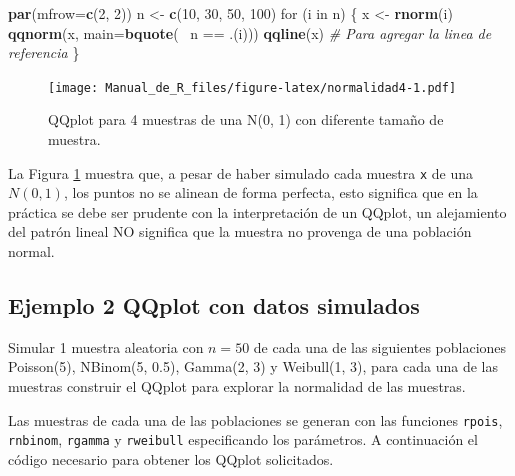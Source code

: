 \documentclass[10pt,]{krantz}
\makeatletter
\newenvironment{Shaded}{\begin{snugshade}}{\end{snugshade}}
\newcommand{\KeywordTok}[1]{\textcolor[rgb]{0.13,0.29,0.53}{\textbf{{#1}}}}
\newcommand{\DataTypeTok}[1]{\textcolor[rgb]{0.13,0.29,0.53}{{#1}}}
\newcommand{\DecValTok}[1]{\textcolor[rgb]{0.00,0.00,0.81}{{#1}}}
\newcommand{\StringTok}[1]{\textcolor[rgb]{0.31,0.60,0.02}{{#1}}}
\newcommand{\CommentTok}[1]{\textcolor[rgb]{0.56,0.35,0.01}{\textit{{#1}}}}
\newcommand{\NormalTok}[1]{{#1}}
\newenvironment{kframe}{%
\medskip{}
\setlength{\fboxsep}{.8em}
 \def\at@end@of@kframe{}%
 \ifinner\ifhmode%
  \def\at@end@of@kframe{\end{minipage}}%
  \begin{minipage}{\columnwidth}%
 \fi\fi%
 \def\FrameCommand##1{\hskip\@totalleftmargin \hskip-\fboxsep
 \colorbox{shadecolor}{##1}\hskip-\fboxsep
     \hskip-\linewidth \hskip-\@totalleftmargin \hskip\columnwidth}%
 \MakeFramed {\advance\hsize-\width
   \@totalleftmargin\z@ \linewidth\hsize
   \@setminipage}}%
 {\par\unskip\endMakeFramed%
 \at@end@of@kframe}
\renewenvironment{Shaded}{\begin{kframe}}{\end{kframe}}
\makeatother
\begin{document}
\begin{Shaded}
\begin{Highlighting}[]
\KeywordTok{par}\NormalTok{(}\DataTypeTok{mfrow=}\KeywordTok{c}\NormalTok{(}\DecValTok{2}\NormalTok{, }\DecValTok{2}\NormalTok{))}
\NormalTok{n <-}\StringTok{ }\KeywordTok{c}\NormalTok{(}\DecValTok{10}\NormalTok{, }\DecValTok{30}\NormalTok{, }\DecValTok{50}\NormalTok{, }\DecValTok{100}\NormalTok{)}
\NormalTok{for (i in n) \{}
  \NormalTok{x <-}\StringTok{ }\KeywordTok{rnorm}\NormalTok{(i)}
  \KeywordTok{qqnorm}\NormalTok{(x, }\DataTypeTok{main=}\KeywordTok{bquote}\NormalTok{(~}\StringTok{ }\NormalTok{n ==}\StringTok{ }\NormalTok{.(i)))}
  \KeywordTok{qqline}\NormalTok{(x)  }\CommentTok{# Para agregar la linea de referencia}
\NormalTok{\}}
\end{Highlighting}
\end{Shaded}

\begin{figure}[htbp]
\centering
\texttt{[image: Manual\_de\_R\_files/figure-latex/normalidad4-1.pdf]}
\caption{\label{fig:normalidad4}QQplot para 4 muestras de una N(0, 1) con
diferente tamaño de muestra.}
\end{figure}

La Figura \ref{fig:normalidad4} muestra que, a pesar de haber simulado
cada muestra \texttt{x} de una \(N(0, 1)\), los puntos no se alinean de
forma perfecta, esto significa que en la práctica se debe ser prudente
con la interpretación de un QQplot, un alejamiento del patrón lineal NO
significa que la muestra no provenga de una población normal.

\subsection*{Ejemplo 2 QQplot con datos
simulados}\label{ejemplo-2-qqplot-con-datos-simulados}


Simular 1 muestra aleatoria con \(n=50\) de cada una de las siguientes
poblaciones Poisson(5), NBinom(5, 0.5), Gamma(2, 3) y Weibull(1, 3),
para cada una de las muestras construir el QQplot para explorar la
normalidad de las muestras.

Las muestras de cada una de las poblaciones se generan con las funciones
\texttt{rpois}, \texttt{rnbinom}, \texttt{rgamma} y \texttt{rweibull}
especificando los parámetros. A continuación el código necesario para
obtener los QQplot solicitados.
\end{document}
